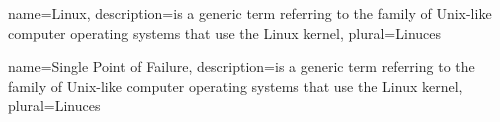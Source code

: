 
\usepackage[xindy,acronym,toc]{glossaries}
\makeglossaries
\renewcommand*\glspostdescription{\dotfill}




{
  name=Linux,
  description={is a generic term referring to the family of Unix-like
               computer operating systems that use the Linux kernel},
  plural=Linuces
}

{
  name=Single Point of Failure,
  description={is a generic term referring to the family of Unix-like
               computer operating systems that use the Linux kernel},
  plural=Linuces
}

